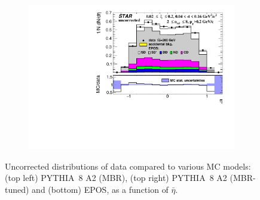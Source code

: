 \begin{figure}[h!]
\begin{subfigure}{.49\textwidth}
		\includegraphics[width=\linewidth, page=1]{chapters/chrgSTAR/img/nonSD/chrg/SDT_epos_xi0_RP_starsim_eta.pdf}
	\end{subfigure}
	\begin{minipage}{.49\textwidth}
		\caption{Uncorrected distributions of data compared to various MC models: (top left) PYTHIA~8 A2 (MBR), (top right) PYTHIA~8 A2 (MBR-tuned) and (bottom) EPOS, as a function of $\bar{\eta}$. }
		\label{fig:nonSDera}
	\end{minipage}
	
\end{figure}
\FloatBarrier